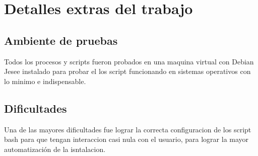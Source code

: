 \documentclass[11pt]{article}
\begin{document}
\section{Detalles extras del trabajo}

\subsection{Ambiente de pruebas}
Todos los procesos y scripts fueron probados en una maquina virtual con Debian Jesee instalado para probar el los script funcionando en sistemas operativos con lo minimo e indispensable.

\subsection{Dificultades}
Una de las mayores dificultades fue lograr la correcta configuracion de los script bash para que tengan interaccion casi nula con el usuario, para lograr la mayor automatización de la isntalacion. 
\end{document}
